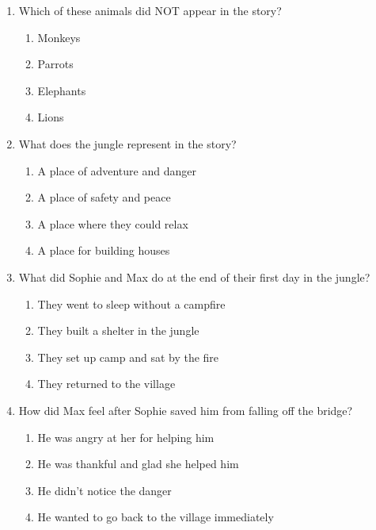 \documentclass[12pt]{article}
\begin{document}
\begin{enumerate}
    \vspace{0.5cm}

    \item Which of these animals did NOT appear in the story?

    \begin{enumerate}[label=\Alph*.]
        \item Monkeys
        \item Parrots
        \item Elephants
        \item Lions
    \end{enumerate}
    
    \vspace{0.5cm}

    \item What does the jungle represent in the story?

    \begin{enumerate}[label=\Alph*.]
        \item A place of adventure and danger
        \item A place of safety and peace
        \item A place where they could relax
        \item A place for building houses
    \end{enumerate}
    
    \vspace{0.5cm}

    \item What did Sophie and Max do at the end of their first day in the jungle?

    \begin{enumerate}[label=\Alph*.]
        \item They went to sleep without a campfire
        \item They built a shelter in the jungle
        \item They set up camp and sat by the fire
        \item They returned to the village
    \end{enumerate}
    
    \vspace{0.5cm}

    \item How did Max feel after Sophie saved him from falling off the bridge?

    \begin{enumerate}[label=\Alph*.]
        \item He was angry at her for helping him
        \item He was thankful and glad she helped him
        \item He didn’t notice the danger
        \item He wanted to go back to the village immediately
    \end{enumerate}
    

\end{enumerate}
\end{document}
